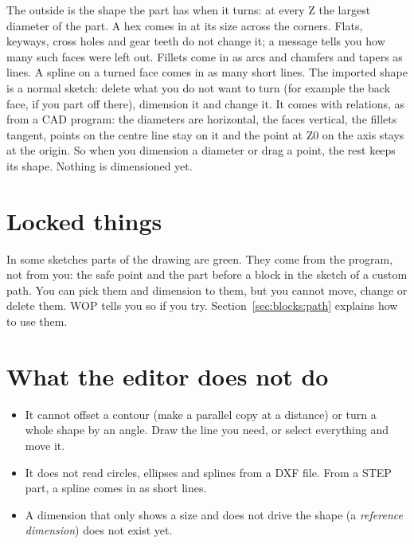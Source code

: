 The outside is the shape the part has when it turns: at every Z the largest diameter of the part. A hex comes in at its size across the corners. Flats, keyways, cross holes and gear teeth do not change it; a message tells you how many such faces were left out. Fillets come in as arcs and chamfers and tapers as lines. A spline on a turned face comes in as many short lines. The imported shape is a normal sketch: delete what you do not want to turn (for example the back face, if you part off there), dimension it and change it. It comes with relations, as from a CAD program: the diameters are horizontal, the faces vertical, the fillets tangent, points on the centre line stay on it and the point at Z0 on the axis stays at the origin. So when you dimension a diameter or drag a point, the rest keeps its shape. Nothing is dimensioned yet.

\section{Locked things}\label{sec:sketch:locked}

In some sketches parts of the drawing are \textcolor{green!45!black}{green}. They come from the program, not from you: the safe point and the part before a block in the sketch of a custom path. You can pick them and dimension to them, but you cannot move, change or delete them. WOP tells you so if you try. Section~\ref{sec:blocks:path} explains how to use them.

\section{What the editor does not do}\label{sec:sketch:limits}

\begin{itemize}
\item It cannot offset a contour (make a parallel copy at a distance) or turn a whole shape by an angle. Draw the line you need, or select everything and move it.
\item It does not read circles, ellipses and splines from a DXF file. From a STEP part, a spline comes in as short lines.
\item A dimension that only shows a size and does not drive the shape (a \emph{reference dimension}) does not exist yet.
\end{itemize}
